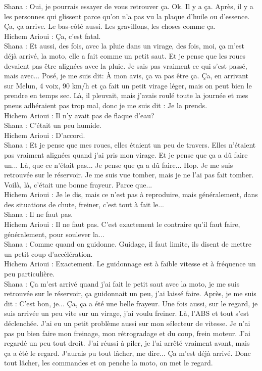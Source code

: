 Shana : Oui, je pourrais essayer de vous retrouver ça. Ok. Il y a ça. Après, il y a les personnes qui glissent parce qu'on n'a pas vu la plaque d'huile ou d'essence. Ça, ça arrive. Le bas-côté aussi. Les gravillons, les choses comme ça. \\
Hichem Arioui : Ça, c'est fatal. \\
Shana : Et aussi, des fois, avec la pluie dans un virage, des fois, moi, ça m'est déjà arrivé, la moto, elle a fait comme un petit saut. Et je pense que les roues devaient pas être alignées avec la pluie. Je sais pas vraiment ce qui s'est passé, mais avec... Posé, je me suis dit: À mon avis, ça va pas être ça. Ça, en arrivant sur Melun, 4 voix, 90 km/h et ça fait un petit virage léger, mais on peut bien le prendre en temps sec. Là, il pleuvait, mais j'avais roulé toute la journée et mes pneus adhéraient pas trop mal, donc je me suis dit : Je la prends. \\
Hichem Arioui : Il n'y avait pas de flaque d'eau? \\
Shana : C'était un peu humide. \\
Hichem Arioui : D'accord. \\
Shana : Et je pense que mes roues, elles étaient un peu de travers. Elles n'étaient pas vraiment alignées quand j'ai pris mon virage. Et je pense que ça a dû faire un... Là, que ce n'était pas... Je pense que ça a dû faire... Hop. Je me suis retrouvée sur le réservoir. Je me suis vue tomber, mais je ne l'ai pas fait tomber. Voilà, là, c'était une bonne frayeur. 
Parce que... \\
Hichem Arioui : Je le dis, mais ce n'est pas à reproduire, mais généralement, dans des situations de chute, freiner, c'est tout à fait le... \\
Shana : Il ne faut pas. \\
Hichem Arioui : Il ne faut pas. C'est exactement le contraire qu'il faut faire, généralement, pour soulever la... \\
Shana : Comme quand on guidonne. Guidage, il faut limite, ils disent de mettre un petit coup d'accélération. \\
Hichem Arioui : Exactement. Le guidonnage est à faible vitesse et à fréquence un peu particulière. \\
Shana : Ça m'est arrivé quand j'ai fait le petit saut avec la moto, je me suis retrouvée sur le réservoir, ça guidonnait un peu, j'ai laissé faire. Après, je me suis dit : C'est bon, je... Ça, ça a été une belle frayeur. Une fois aussi, sur le regard, je suis arrivée un peu vite sur un virage, j'ai voulu freiner. Là, l'ABS et tout s'est déclenchée. J'ai eu un petit problème aussi sur mon sélecteur de vitesse. Je n'ai pas pu bien faire mon freinage, mon rétrogradage et du coup, frein moteur. J'ai regardé un peu tout droit. J'ai réussi à piler, je l'ai arrêté vraiment avant, mais ça a été le regard. J'aurais pu tout lâcher, me dire... Ça m'est déjà arrivé. Donc tout lâcher, les commandes et on penche la moto, on met le regard. \\

